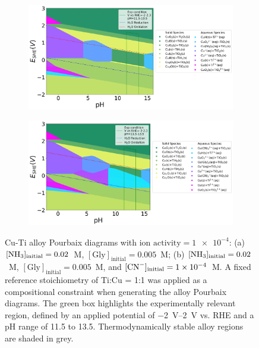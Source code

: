 \documentclass[journal=jacsat,manuscript=article]{achemso}
\begin{document}
\begin{figure}[htbp]
    \centering
    \begin{subfigure}[b]{0.45\textwidth}
        \subcaption{}\label{fig:TiCu_Pourbaix_NH3_Gly}
        \includegraphics[width=\textwidth]
        {Figures/alloy_pourbaix_diagrams/Ti_Cu_alloy_Ti0.5 Cu0.5_NH3=0.02M_Gly=0.005M_CN=0M_activity=1e-04M.png}
    \end{subfigure}
    \begin{subfigure}[b]{0.45\textwidth}
        \subcaption{}\label{fig:TiCu_Pourbaix_NH3_Gly_CN}
        \includegraphics[width=\textwidth]{Figures/alloy_pourbaix_diagrams/Ti_Cu_alloy_Ti0.5 Cu0.5_NH3=0.02M_Gly=0.005M_CN=0.0001M_activity=1e-04M.png}
    \end{subfigure}
    \caption{Cu-Ti alloy Pourbaix diagrams with $\text{ion activity} = \num{1e-4}$: (a) $[\ce{NH3}]_\text{initial} = 0.02$~M, $[\text{Gly}]_\text{initial} = 0.005$~M; (b) $[\ce{NH3}]_\text{initial} = 0.02$~M, $[\text{Gly}]_\text{initial} = 0.005$~M, and $[\ce{CN^-}]_\text{initial} = \num{1e-4}$~M. A fixed reference stoichiometry of Ti:Cu = 1:1 was applied as a compositional constraint when generating the alloy Pourbaix diagrams. The green box highlights the experimentally relevant region, defined by an applied potential of \SIrange{-2}{2}{V} vs. RHE and a pH range of 11.5 to 13.5. Thermodynamically stable alloy regions are shaded in grey.}
    \label{fig:TiCu_alloy_Pourbaix}
\end{figure}
\end{document}
